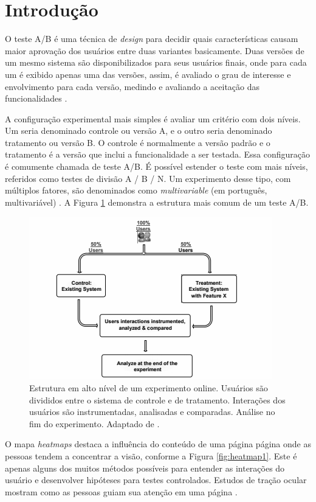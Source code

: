 \documentclass[12pt]{article}
\begin{document}
\section{Introdução}

O teste A/B é uma técnica de \textit{design} para decidir quais características causam maior aprovação dos usuários entre duas variantes basicamente. Duas versões de um mesmo sistema são disponibilizados para seus usuários finais, onde para cada um é exibido apenas uma das versões, assim, é avaliado o grau de interesse e envolvimento para cada versão, medindo e avaliando a aceitação das funcionalidades \cite{goward:13}.

A configuração experimental mais simples é avaliar um critério com dois níveis. Um seria denominado controle ou versão A, e o outro seria denominado tratamento ou versão B.
O controle é normalmente a versão padrão e o tratamento é a versão que inclui a funcionalidade a ser testada. Essa configuração é comumente chamada de teste A/B.
É possível estender o teste com mais níveis, referidos como testes de divisão A / B / N. Um experimento desse tipo, com múltiplos fatores, são denominados como \textit{multivariable} (em português, multivariável) \cite{kohavi2010online}. A Figura \ref{fig:onlineExp1} demonstra a estrutura mais comum de um teste A/B.

\begin{figure}[ht]
\centering
\includegraphics[width=.8\textwidth]{fig2.png}
\caption{Estrutura em alto nível de um experimento online. Usuários são divididos entre o sistema de controle e de tratamento. Interações dos usuários são instrumentadas, analisadas e comparadas. Análise no fim do experimento. Adaptado de \cite{kohavi2010online}.}
\label{fig:onlineExp1}
\end{figure}

O mapa \textit{heatmaps} destaca a influência do conteúdo de uma página página onde as pessoas tendem a concentrar a visão, conforme a Figura \ref{fig:heatmap1}. Este é apenas alguns dos muitos métodos possíveis para entender as interações do usuário e desenvolver hipóteses para testes controlados. Estudos de tração ocular mostram como as pessoas guiam sua atenção em uma página \cite{goward:13}.
\end{document}
